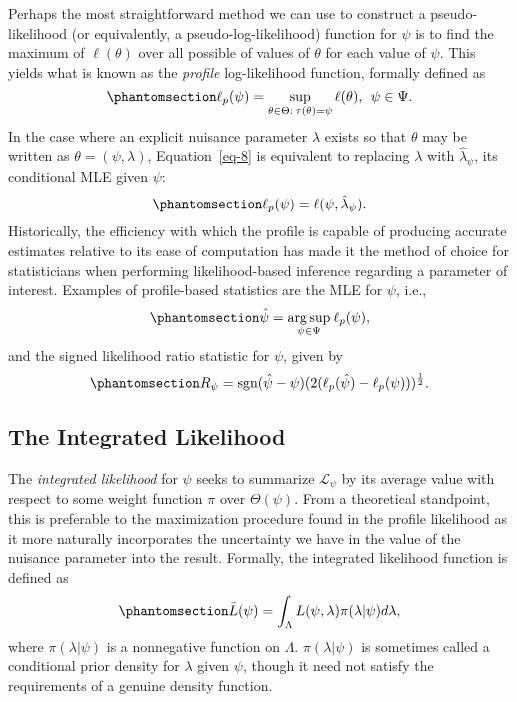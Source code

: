 \documentclass[
  12pt]{article}
\begin{document}
Perhaps the most straightforward method we can use to construct a
pseudo-likelihood (or equivalently, a pseudo-log-likelihood) function
for \(\psi\) is to find the maximum of \(\ell(\theta)\) over all
possible of values of \(\theta\) for each value of \(\psi\). This yields
what is known as the \emph{profile} log-likelihood function, formally
defined as \begin{equation}\phantomsection\label{eq-8}{
\ell_p(\psi) = \sup_{\theta \in \Theta: \> \tau(\theta) = \psi} \ell(\theta), \> \> \psi \in \Psi.
}\end{equation} In the case where an explicit nuisance parameter
\(\lambda\) exists so that \(\theta\) may be written as
\(\theta = (\psi, \lambda)\), Equation~\ref{eq-8} is equivalent to
replacing \(\lambda\) with \(\hat{\lambda}_{\psi}\), its conditional MLE
given \(\psi\): \begin{equation}\phantomsection\label{eq-9}{
\ell_p(\psi) = \ell(\psi, \hat{\lambda}_{\psi}).
}\end{equation} Historically, the efficiency with which the profile is
capable of producing accurate estimates relative to its ease of
computation has made it the method of choice for statisticians when
performing likelihood-based inference regarding a parameter of interest.
Examples of profile-based statistics are the MLE for \(\psi\), i.e.,
\begin{equation}\phantomsection\label{eq-10}{
\hat{\psi} = \underset{\psi \in \Psi}{\arg\sup} \> \ell_p(\psi),
}\end{equation} and the signed likelihood ratio statistic for \(\psi\),
given by \begin{equation}\phantomsection\label{eq-10}{
R_{\psi} = \text{sgn}(\hat{\psi} - \psi)(2(\ell_p(\hat{\psi}) - \ell_p(\psi)))^{\frac{1}{2}}.
}\end{equation}

\subsection{The Integrated Likelihood}\label{the-integrated-likelihood}

The \emph{integrated likelihood} for \(\psi\) seeks to summarize
\(\mathcal{L}_{\psi}\) by its average value with respect to some weight
function \(\pi\) over \(\Theta(\psi)\). From a theoretical standpoint,
this is preferable to the maximization procedure found in the profile
likelihood as it more naturally incorporates the uncertainty we have in
the value of the nuisance parameter into the result. Formally, the
integrated likelihood function is defined as
\begin{equation}\phantomsection\label{eq-11}{
\bar{L}(\psi) = \int_{\Lambda}L(\psi, \lambda)\pi(\lambda|\psi)d\lambda,
}\end{equation} where \(\pi(\lambda|\psi)\) is a nonnegative function on
\(\Lambda\). \(\pi(\lambda|\psi)\) is sometimes called a conditional
prior density for \(\lambda\) given \(\psi\), though it need not satisfy
the requirements of a genuine density function.
\end{document}
